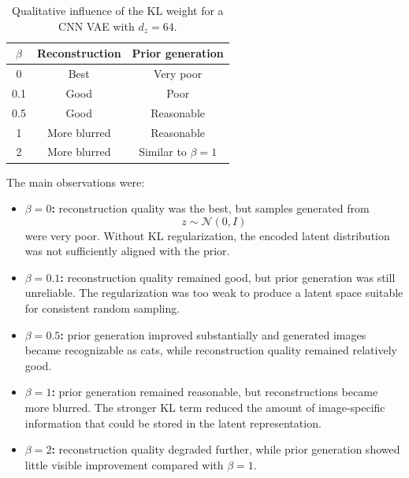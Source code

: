 \documentclass[a4paper,11pt]{article}
\begin{document}
\begin{table}[h]
\centering
\renewcommand{\arraystretch}{1.25}
\begin{tabular}{c|c|c}
\hline
$\beta$
& Reconstruction
& Prior generation \\
\hline
0
& Best
& Very poor \\

0.1
& Good
& Poor \\

0.5
& Good
& Reasonable \\

1
& More blurred
& Reasonable \\

2
& More blurred
& Similar to $\beta=1$ \\
\hline
\end{tabular}
\caption{Qualitative influence of the KL weight for a CNN VAE with $d_z=64$.}
\label{tab:beta_comparison}
\end{table}

The main observations were:

\begin{itemize}
    \item \textbf{$\beta=0$:} reconstruction quality was the best, but samples generated from
    \[
    z \sim \mathcal{N}(0,I)
    \]
    were very poor. Without KL regularization, the encoded latent distribution was not sufficiently aligned with the prior.

    \item \textbf{$\beta=0.1$:} reconstruction quality remained good, but prior generation was still unreliable. The regularization was too weak to produce a latent space suitable for consistent random sampling.

    \item \textbf{$\beta=0.5$:} prior generation improved substantially and generated images became recognizable as cats, while reconstruction quality remained relatively good.

    \item \textbf{$\beta=1$:} prior generation remained reasonable, but reconstructions became more blurred. The stronger KL term reduced the amount of image-specific information that could be stored in the latent representation.

    \item \textbf{$\beta=2$:} reconstruction quality degraded further, while prior generation showed little visible improvement compared with $\beta=1$.
\end{itemize}
\end{document}
